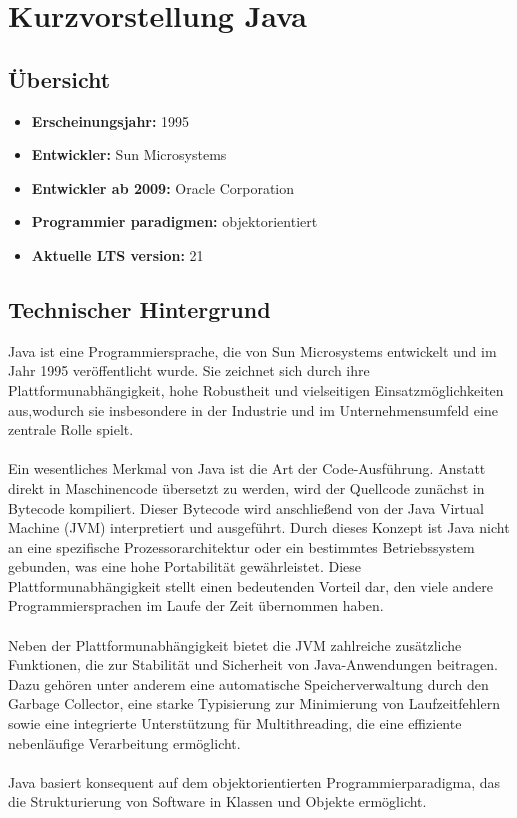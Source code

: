 \documentclass[11pt]{article}
\begin{document}
    \section{Kurzvorstellung Java}

    \subsection{Übersicht}
    \begin{itemize}
        \item \textbf{Erscheinungsjahr:} 1995
        \item \textbf{Entwickler:} Sun Microsystems
        \item \textbf{Entwickler ab 2009:} Oracle Corporation
        \item \textbf{Programmier paradigmen:} objektorientiert
        \item \textbf{Aktuelle LTS version:} 21
    \end{itemize}

    \subsection{Technischer Hintergrund}
    Java ist eine Programmiersprache, die von Sun Microsystems entwickelt und im Jahr 1995 veröffentlicht wurde.
    Sie zeichnet sich durch ihre Plattformunabhängigkeit, hohe Robustheit und vielseitigen Einsatzmöglichkeiten aus,wodurch sie insbesondere in der Industrie und im Unternehmensumfeld eine zentrale Rolle spielt.\\
    \\
    Ein wesentliches Merkmal von Java ist die Art der Code-Ausführung.
    Anstatt direkt in Maschinencode übersetzt zu werden, wird der Quellcode zunächst in Bytecode kompiliert.
    Dieser Bytecode wird anschließend von der Java Virtual Machine (JVM) interpretiert und ausgeführt.
    Durch dieses Konzept ist Java nicht an eine spezifische Prozessorarchitektur oder ein bestimmtes Betriebssystem gebunden, was eine hohe Portabilität gewährleistet.
    Diese Plattformunabhängigkeit stellt einen bedeutenden Vorteil dar, den viele andere Programmiersprachen im Laufe der Zeit übernommen haben.\\
    \\
    Neben der Plattformunabhängigkeit bietet die JVM zahlreiche zusätzliche
    Funktionen, die zur Stabilität und Sicherheit von Java-Anwendungen beitragen.
    Dazu gehören unter anderem eine automatische Speicherverwaltung
    durch den Garbage Collector, eine starke Typisierung zur Minimierung
    von Laufzeitfehlern sowie eine integrierte Unterstützung für Multithreading,
    die eine effiziente nebenläufige Verarbeitung ermöglicht. \cite[51 - 54]{insel}\\
    \\
    Java basiert konsequent auf dem objektorientierten Programmierparadigma, das die Strukturierung von Software in Klassen und Objekte ermöglicht. \\
    \\
\end{document}
